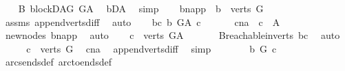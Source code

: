 \begin{isabellebody}
\isamarkupfalse%
\isanewline
\ \ \isamarkupfalse%
\ B{}{\isacharcolon}{\kern0pt}\ blockDAG\ G{\isacharunderscore}{\kern0pt}A\ \isamarkupfalse%
\ bD{\isacharunderscore}{\kern0pt}A\ \isamarkupfalse%
\ simp\isanewline
\ \ \isamarkupfalse%
\ b{\isacharunderscore}{\kern0pt}napp\ {\isacharcolon}{\kern0pt}\ {\isachardoublequoteopen}b\ {\isasymin}\ verts\ G{\isachardoublequoteclose}\ \isamarkupfalse%
\ assms{\isacharparenleft}{\kern0pt}{}{\isacharparenright}{\kern0pt}\ append{\isacharunderscore}{\kern0pt}verts{\isacharunderscore}{\kern0pt}diff\ \isamarkupfalse%
\ auto\isanewline
\ \ \isamarkupfalse%
\ bc{\isacharcolon}{\kern0pt}\ {\isachardoublequoteopen}b\ {\isasymrightarrow}\isactrlbsub G{\isacharunderscore}{\kern0pt}A\isactrlesub \ c{\isachardoublequoteclose}\ \isanewline
\ \ \isamarkupfalse%
\ \isamarkupfalse%
\ c{\isacharunderscore}{\kern0pt}na{\isacharcolon}{\kern0pt}\ \ {\isachardoublequoteopen}c\ {\isasymnotin}\ A{\isachardoublequoteclose}\ \isamarkupfalse%
\ new{\isacharunderscore}{\kern0pt}nodes\ b{\isacharunderscore}{\kern0pt}napp\ \isamarkupfalse%
\ auto\isanewline
\ \ \isamarkupfalse%
\ {\isachardoublequoteopen}c\ {\isasymin}\ verts\ G{\isacharunderscore}{\kern0pt}A{\isachardoublequoteclose}\ \isanewline
\ \ \ \ \isamarkupfalse%
\ B{}{\isachardot}{\kern0pt}reachable{}{\isacharunderscore}{\kern0pt}in{\isacharunderscore}{\kern0pt}verts{\isacharparenleft}{\kern0pt}{}{\isacharparenright}{\kern0pt}\ bc\ \isamarkupfalse%
\ auto\isanewline
\ \ \isamarkupfalse%
\ \isamarkupfalse%
\ {\isachardoublequoteopen}c\ {\isasymin}\ verts\ G{\isachardoublequoteclose}\ \isamarkupfalse%
\ c{\isacharunderscore}{\kern0pt}na\ \isamarkupfalse%
\ append{\isacharunderscore}{\kern0pt}verts{\isacharunderscore}{\kern0pt}diff{\isacharprime}{\kern0pt}\ \isamarkupfalse%
\ simp\ \ \isanewline
\ \ \isamarkupfalse%
\ \isamarkupfalse%
\ {\isachardoublequoteopen}b\ {\isasymrightarrow}\isactrlbsub G\isactrlesub \ c{\isachardoublequoteclose}\ \ \isamarkupfalse%
\ arcs{\isacharunderscore}{\kern0pt}ends{\isacharunderscore}{\kern0pt}def\ arc{\isacharunderscore}{\kern0pt}to{\isacharunderscore}{\kern0pt}ends{\isacharunderscore}{\kern0pt}def\isanewline

\end{isabellebody}
